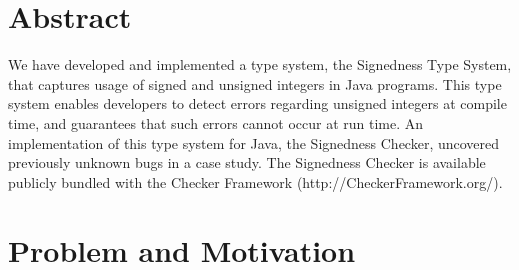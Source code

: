 \section*{Abstract}
We have developed and implemented a type system, the Signedness Type System,
that captures usage of signed and unsigned integers in Java programs. This
type system enables developers to detect errors regarding unsigned integers at
compile time, and guarantees that such errors cannot occur at run time. An
implementation of this type system for Java, the Signedness Checker, uncovered
previously unknown bugs in a case study. The Signedness Checker is available
publicly bundled with the Checker Framework (http://CheckerFramework.org/).

\newpage
\tableofcontents

\newpage
\section{Problem and Motivation} \label{prob}

